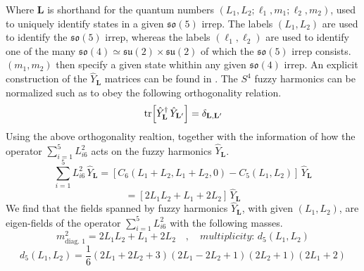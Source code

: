 %
%
Where $\mathbf{L}$ is shorthand for the quantum numbers $(L_1, L_2; \ell_1, m_1; \ell_2, m_2)$, used to uniquely identify states in a given $\mathfrak{so}(5)$ irrep. The labels $(L_1, L_2)$ are used to identify the $\mathfrak{so}(5)$ irrep, whereas the labels $(\ell_1, \ell_2)$ are used to identify one of the many $\mathfrak{so}(4) \simeq \mathfrak{su}(2) \times \mathfrak{su}(2)$ of which the $\mathfrak{so}(5)$ irrep consists. $(m_1,m_2)$ then specify a given state whithin any given $\mathfrak{so}(4)$ irrep. An explicit construction of the $\hat{Y}_{\mathbf{L}}$ matrices can be found in \cite{Fuzzy harmonics on S4}. The $S^4$ fuzzy harmonics can be normalized such as to obey the following orthogonality relation.
%
%
\begin{equation}
\tr[\hat{Y}_{\mathbf{L}}^\dagger \, \hat{Y}_{\mathbf{L}'}]
=
\delta_{\mathbf{L}, \mathbf{L}'}
\end{equation}
%
%
Using the above orthogonality realtion, together with the information of how the operator $\sum_{i=1}^5 L_{i6}^2$ acts on the fuzzy harmonics $\hat{Y}_{\mathbf{L}}$.
%
%
\begin{equation*}
\sum_{i=1}^5 L_{i6}^2 \, \hat{Y}_{\mathbf{L}}
=
[C_6(L_1 + L_2, L_1 + L_2, 0) - C_5(L_1, L_2)] \, \hat{Y}_{\mathbf{L}}
\end{equation*}
%
%
\begin{equation}
=
[2 L_1 L_2 + L_1 + 2 L_2] \, \hat{Y}_{\mathbf{L}}
\end{equation}
%
%
We find that the fields spanned by fuzzy harmonics $\hat{Y}_{\mathbf{L}}$, with given $(L_1, L_2)$, are eigen-fields of the operator $\sum_{i=1}^5 L_{i6}^2$ with the following masses.
%
%
\begin{equation}
m^2_{\text{diag. 1}}
=
2 L_1 L_2 + L_1 + 2 L_2
%
\quad , \quad
%
\textit{multiplicity: }
d_5(L_1, L_2)
\end{equation}
%
%
\begin{equation}
d_5(L_1, L_2)
=
\frac{1}{6} (2 L_1 + 2 L_2 + 3)(2 L_1 - 2 L_2 + 1)(2 L_2 + 1)(2 L_1 + 2) 
\end{equation}
%
%

